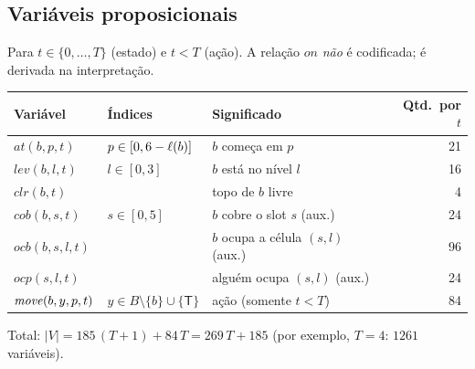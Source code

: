 \documentclass[11pt,a4paper]{article}
\newcommand{\at}{\mathit{at}}\newcommand{\lev}{\mathit{lev}}\newcommand{\clr}{\mathit{clr}}
\newcommand{\Tm}{\mathsf{T}}
\begin{document}
\subsection{Variáveis proposicionais}
Para $t\in\{0,\dots,T\}$ (estado) e $t<T$ (ação). A relação $\mathit{on}$ \emph{não} é codificada; é derivada na interpretação.
\begin{center}\small\begin{tabular}{@{}llp{6.4cm}r@{}}\toprule
Variável & Índices & Significado & Qtd.\ por $t$\\\midrule
$\at(b,p,t)$ & $p\in[0,6-\ell(b)]$ & $b$ começa em $p$ & 21\\
$\lev(b,l,t)$ & $l\in[0,3]$ & $b$ está no nível $l$ & 16\\
$\clr(b,t)$ & & topo de $b$ livre & 4\\
$\mathit{cob}(b,s,t)$ & $s\in[0,5]$ & $b$ cobre o slot $s$ (aux.) & 24\\
$\mathit{ocb}(b,s,l,t)$ & & $b$ ocupa a célula $(s,l)$ (aux.) & 96\\
$\mathit{ocp}(s,l,t)$ & & alguém ocupa $(s,l)$ (aux.) & 24\\
$\mathit{move}(b,y,p,t)$ & $y\in B\setminus\{b\}\cup\{\Tm\}$ & ação (somente $t<T$) & 84\\\bottomrule
\end{tabular}\end{center}
Total: $|V|=185\,(T+1)+84\,T = 269\,T+185$ (por exemplo, $T=4$: $1261$ variáveis).
\end{document}
